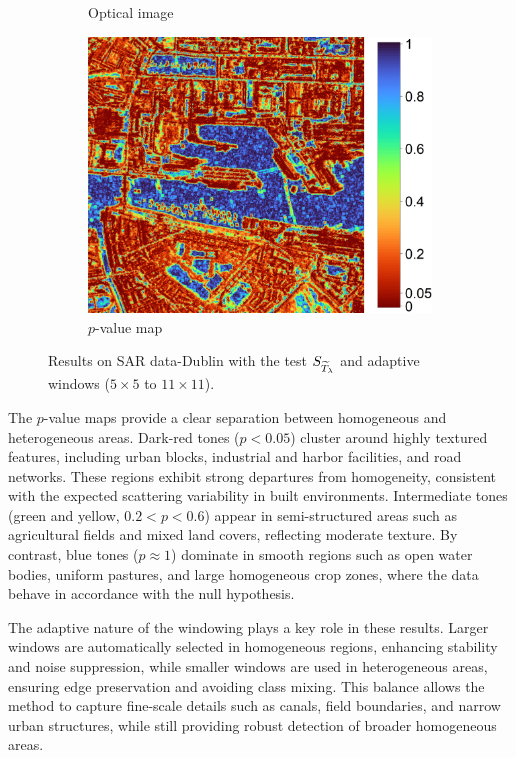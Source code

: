 \documentclass[
  lettersize  journal,
]{IEEEtran}%
\begin{document}
\begin{figure}[hbt]
\begin{subfigure}{0.25\textwidth}
        \caption{Optical image   }
        \label{fig:dublin-o}
    \end{subfigure}
   \hspace{0.00001\textwidth}
    \begin{subfigure}{0.31\textwidth}
        \includegraphics[width=\linewidth]{./Figures/p-values_dublin5v1.png}
        \caption{$p$-value map   }
        \label{fig:dublinp}
    \end{subfigure}
   \caption{Results on SAR data-Dublin with the test $\small{S_{\widetilde{T}_{\lambda}}}$ and adaptive windows ($5\times5$ to $11\times11$). }
    \label{fig:dublin}
\end{figure}

The \(p\)-value maps provide a clear separation between homogeneous and
heterogeneous areas. Dark-red tones (\(p < 0.05\)) cluster around highly
textured features, including urban blocks, industrial and harbor
facilities, and road networks. These regions exhibit strong departures
from homogeneity, consistent with the expected scattering variability in
built environments. Intermediate tones (green and yellow,
\(0.2 < p < 0.6\)) appear in semi-structured areas such as agricultural
fields and mixed land covers, reflecting moderate texture. By contrast,
blue tones (\(p \approx 1\)) dominate in smooth regions such as open
water bodies, uniform pastures, and large homogeneous crop zones, where
the data behave in accordance with the null hypothesis.

The adaptive nature of the windowing plays a key role in these results.
Larger windows are automatically selected in homogeneous regions,
enhancing stability and noise suppression, while smaller windows are
used in heterogeneous areas, ensuring edge preservation and avoiding
class mixing. This balance allows the method to capture fine-scale
details such as canals, field boundaries, and narrow urban structures,
while still providing robust detection of broader homogeneous areas.
\end{document}
